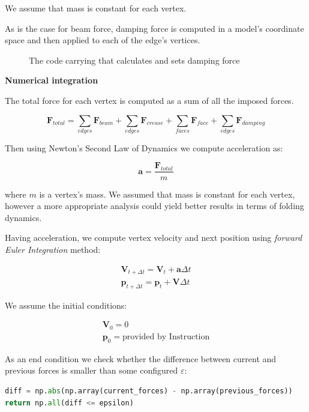 We assume that mass is constant for each vertex.

As is the case for beam force, damping force is computed in a model's coordinate space
and then applied to each of the edge's vertices.
\smallskip

\begin{figure}[H]
	\centering
	\caption{The code carrying that calculates and sets damping force}
	
\end{figure}

\clearpage
\textbf{Numerical integration}
\smallskip

The total force for each vertex is computed as a sum of all the imposed forces.

\begin{equation} \label{Solver:total_force}
	\pmb{F}_{total} = \sum_{edges} \pmb{F}_{beam} + \sum_{edges} \pmb{F}_{crease} + \sum_{faces}\pmb{F}_{face} + \sum_{edges}\pmb{F}_{damping}
\end{equation}

Then using Newton's Second Law of Dynamics we compute acceleration as:

$$
\pmb{a} = \frac{\pmb{F}_{total}}{m}
$$

where $m$ is a vertex's mass. We assumed that mass is constant for each vertex, however a more appropriate analysis could yield
better results in terms of folding dynamics.

Having acceleration, we compute vertex velocity and next position using \textit{forward Euler Integration} method:

$$
\begin{aligned}
\pmb{V}_{t+\Delta t} = \pmb{V}_t + \pmb{a}\Delta t \\
\pmb{p}_{t+\Delta t} = \pmb{p}_t + \pmb{V}\Delta t
\end{aligned}
$$

We assume the initial conditions:

\begin{equation}
	\begin{aligned}
		\pmb{V}_0 = 0\\
		\pmb{p}_0 = \text{provided by Instruction}
	\end{aligned}
\end{equation}


As an end condition we check whether the difference between current and previous forces is smaller than some configured $\varepsilon$:

\begin{lstlisting}[language=Python]
diff = np.abs(np.array(current_forces) - np.array(previous_forces))
return np.all(diff <= epsilon)
\end{lstlisting}

